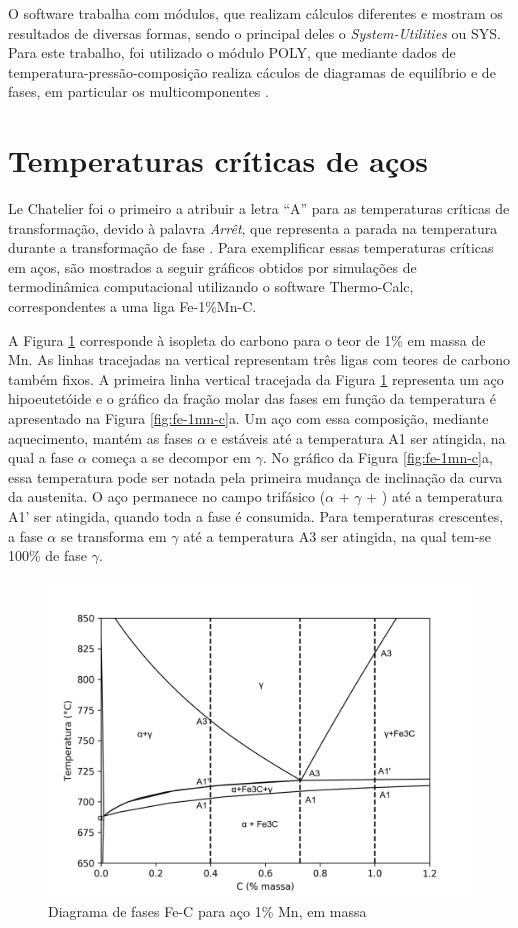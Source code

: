 \documentclass[brazil,tf,epusp]{usp}  %
\begin{document}
O software trabalha com módulos, que realizam cálculos diferentes e mostram os resultados de diversas formas, sendo o principal deles o \textit{System-Utilities} ou SYS. Para este trabalho, foi utilizado o módulo POLY, que mediante dados de temperatura-pressão-composição realiza cáculos de diagramas de equilíbrio e de fases, em particular os multicomponentes \cite{TC2002}.

\section{Temperaturas cr\'iticas de aços}

Le Chatelier foi o primeiro a atribuir a letra ``A'' para as temperaturas críticas de transformação, devido à palavra \textit{Arrêt}, que representa a parada na temperatura durante a transformação de fase \cite{Silva2010}. Para exemplificar essas temperaturas críticas em aços, são mostrados a seguir gráficos obtidos por simulações de termodinâmica computacional utilizando o software Thermo-Calc\textregistered{},  correspondentes a uma liga Fe-1\%Mn-C.

A Figura \ref{fig:fe-1mn-C_isopleth} corresponde à isopleta do carbono para o teor de 1\% em massa de Mn. As linhas tracejadas na vertical representam três ligas com teores de carbono também fixos. A primeira linha vertical tracejada da Figura \ref{fig:fe-1mn-C_isopleth} representa um aço hipoeutetóide e o gráfico da fração molar das fases em função da temperatura é apresentado na Figura \ref{fig:fe-1mn-c}a. Um aço com essa composição, mediante aquecimento, mantém as fases $\alpha$ e  estáveis até a temperatura A1 ser atingida, na qual a fase $\alpha$ começa a se decompor em $\gamma$. No gráfico da Figura \ref{fig:fe-1mn-c}a, essa temperatura pode ser notada pela primeira mudança de inclinação da curva da austenita. O aço permanece no campo trifásico ($\alpha$ + $\gamma$ + ) até a temperatura A1' ser atingida, quando toda a fase  é consumida. Para temperaturas crescentes, a fase $\alpha$ se transforma em $\gamma$ até a temperatura A3 ser atingida, na qual tem-se 100\% de fase $\gamma$.

\begin{figure}[ht!]
  \includegraphics[width=.9\textwidth]{img/Fe-1Mn-C_isopleth_edited.png}
  \caption{Diagrama de fases Fe-C para aço 1\% Mn, em massa}
  \label{fig:fe-1mn-C_isopleth}
\end{figure}
\end{document}
